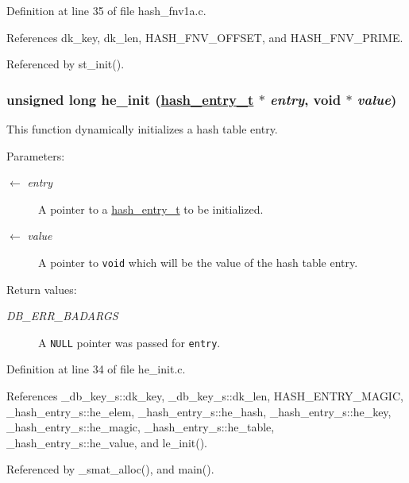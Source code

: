 Definition at line 35 of file hash\_\-fnv1a.c.

References dk\_\-key, dk\_\-len, HASH\_\-FNV\_\-OFFSET, and HASH\_\-FNV\_\-PRIME.

Referenced by st\_\-init().\hypertarget{group__dbprim__hash_ga18}{
\subsubsection[he\_\-init]{\setlength{\rightskip}{0pt plus 5cm}unsigned long he\_\-init (\hyperlink{struct__hash__entry__s}{hash\_\-entry\_\-t} $\ast$ {\em entry}, void $\ast$ {\em value})}}
\label{group__dbprim__hash_ga18}


This function dynamically initializes a hash table entry.

\begin{Desc}
\item[Parameters:]
\begin{description}
\item[\mbox{$\leftarrow$} {\em entry}]A pointer to a \hyperlink{group__dbprim__hash_ga2}{hash\_\-entry\_\-t} to be initialized. \item[\mbox{$\leftarrow$} {\em value}]A pointer to {\tt void} which will be the value of the hash table entry.\end{description}
\end{Desc}
\begin{Desc}
\item[Return values:]
\begin{description}
\item[{\em DB\_\-ERR\_\-BADARGS}]A {\tt NULL} pointer was passed for {\tt entry}.\end{description}
\end{Desc}


Definition at line 34 of file he\_\-init.c.

References \_\-db\_\-key\_\-s::dk\_\-key, \_\-db\_\-key\_\-s::dk\_\-len, HASH\_\-ENTRY\_\-MAGIC, \_\-hash\_\-entry\_\-s::he\_\-elem, \_\-hash\_\-entry\_\-s::he\_\-hash, \_\-hash\_\-entry\_\-s::he\_\-key, \_\-hash\_\-entry\_\-s::he\_\-magic, \_\-hash\_\-entry\_\-s::he\_\-table, \_\-hash\_\-entry\_\-s::he\_\-value, and le\_\-init().

Referenced by \_\-smat\_\-alloc(), and main().

